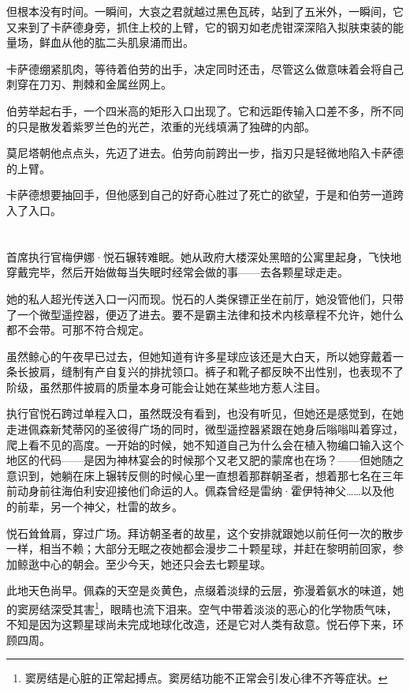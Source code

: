 \documentclass[AutoFakeBold=true]{book}
\begin{document}
但根本没有时间。一瞬间，大哀之君就越过黑色瓦砖，站到了五米外，一瞬间，它又来到了卡萨德身旁，抓住上校的上臂，它的钢刃如老虎钳深深陷入拟肤束装的能量场，鲜血从他的肱二头肌泉涌而出。

卡萨德绷紧肌肉，等待着伯劳的出手，决定同时还击，尽管这么做意味着会将自己刺穿在刀刃、荆棘和金属丝网上。

伯劳举起右手，一个四米高的矩形入口出现了。它和远距传输入口差不多，所不同的只是散发着紫罗兰色的光芒，浓重的光线填满了独碑的内部。

莫尼塔朝他点点头，先迈了进去。伯劳向前跨出一步，指刃只是轻微地陷入卡萨德的上臂。

卡萨德想要抽回手，但他感到自己的好奇心胜过了死亡的欲望，于是和伯劳一道跨入了入口。

\chapter{}

首席执行官梅伊娜·悦石辗转难眠。她从政府大楼深处黑暗的公寓里起身，飞快地穿戴完毕，然后开始做每当失眠时经常会做的事——去各颗星球走走。

她的私人超光传送入口一闪而现。悦石的人类保镖正坐在前厅，她没管他们，只带了一个微型遥控器，便迈了进去。要不是霸主法律和技术内核章程不允许，她什么都不会带。可那不符合规定。

虽然鲸心的午夜早已过去，但她知道有许多星球应该还是大白天，所以她穿戴着一条长披肩，缝制有产自复兴的排扰领口。裤子和靴子都反映不出性别，也表现不了阶级，虽然那件披肩的质量本身可能会让她在某些地方惹人注目。

执行官悦石跨过单程入口，虽然既没有看到，也没有听见，但她还是感觉到，在她走进佩森新梵蒂冈的圣彼得广场的同时，微型遥控器紧跟在她身后嗡嗡叫着穿过，爬上看不见的高度。一开始的时候，她不知道自己为什么会在植入物编口输入这个地区的代码——是因为神林宴会的时候那个又老又肥的蒙席也在场？——但她随之意识到，她躺在床上辗转反侧的时候心里一直想着那群朝圣者，想着那七名在三年前动身前往海伯利安迎接他们命运的人。佩森曾经是雷纳·霍伊特神父……以及他的前辈，另一个神父，杜雷的故乡。

悦石耸耸肩，穿过广场。拜访朝圣者的故星，这个安排就跟她以前任何一次的散步一样，相当不赖；大部分无眠之夜她都会漫步二十颗星球，并赶在黎明前回家，参加鲸逖中心的朝会。至少今天，她还只会去七颗星球。

此地天色尚早。佩森的天空是炎黄色，点缀着淡绿的云层，弥漫着氨水的味道，她的窦房结深受其害\footnote{窦房结是心脏的正常起搏点。窦房结功能不正常会引发心律不齐等症状。}，眼睛也流下泪来。空气中带着淡淡的恶心的化学物质气味，不知是因为这颗星球尚未完成地球化改造，还是它对人类有敌意。悦石停下来，环顾四周。
\end{document}
